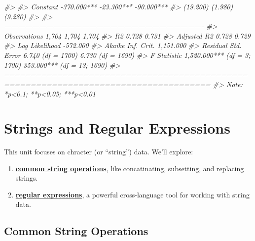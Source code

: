 \documentclass[]{book}
\newenvironment{Shaded}{\begin{snugshade}}{\end{snugshade}}
\newcommand{\CommentTok}[1]{\textcolor[rgb]{0.56,0.35,0.01}{\textit{#1}}}
\providecommand{\tightlist}{%
  \setlength{\itemsep}{0pt}\setlength{\parskip}{0pt}}
\begin{document}
\begin{Shaded}
\begin{Highlighting}[]
\CommentTok{#>                                                                                      }
\CommentTok{#> Constant                    -370.000***                 -23.300***         -90.000***}
\CommentTok{#>                              (19.200)                    (1.980)            (9.280)  }
\CommentTok{#>                                                                                      }
\CommentTok{#> -------------------------------------------------------------------------------------}
\CommentTok{#> Observations                   1,704                      1,704              1,704   }
\CommentTok{#> R2                             0.728                      0.731                      }
\CommentTok{#> Adjusted R2                    0.728                      0.729                      }
\CommentTok{#> Log Likelihood                                                              -572.000 }
\CommentTok{#> Akaike Inf. Crit.                                                          1,151.000 }
\CommentTok{#> Residual Std. Error      6.740 (df = 1700)          6.730 (df = 1690)                }
\CommentTok{#> F Statistic         1,520.000*** (df = 3; 1700) 353.000*** (df = 13; 1690)           }
\CommentTok{#> =====================================================================================}
\CommentTok{#> Note:                                                     *p<0.1; **p<0.05; ***p<0.01}
\end{Highlighting}
\end{Shaded}

\chapter{Strings and Regular
Expressions}\label{strings-and-regular-expressions}

This unit focuses on chracter (or ``string'') data. We'll explore:

\begin{enumerate}
\def\labelenumi{\arabic{enumi}.}
\tightlist
\item
  \textbf{\protect\hyperlink{common-string-operations}{common string
  operations}}, like concatinating, subsetting, and replacing strings.
\item
  \textbf{\protect\hyperlink{regular-expressions}{regular expressions}},
  a powerful cross-language tool for working with string data.
\end{enumerate}

\hypertarget{common-string-operations}{\section{Common String
Operations}\label{common-string-operations}}
\end{document}
